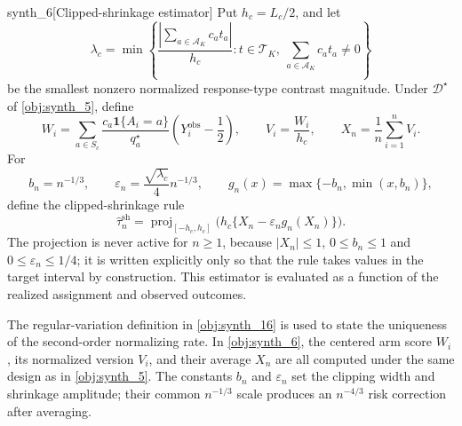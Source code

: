 \documentclass[11pt]{article}
\begin{document}
\begin{definitionv}{synth_6}[Clipped-shrinkage estimator]
Put \(h_c=L_c/2\), and let
\[
\lambda_c
=
\min\left\{
\frac{\left|\sum_{a\in\mathcal A_K} c_a t_a\right|}{h_c}
:
t\in\mathcal T_K,\
\sum_{a\in\mathcal A_K} c_a t_a\neq 0
\right\}
\]
be the smallest nonzero normalized response-type contrast magnitude. Under \(\mathcal D^\star\) of \cref{obj:synth_5}, define
\[
W_i=\sum_{a\in S_c}\frac{c_a\mathbf 1\{A_i=a\}}{q_a^\star}\left(Y_i^{\mathrm{obs}}-\frac12\right),
\qquad
V_i=\frac{W_i}{h_c},
\qquad
X_n=\frac1n\sum_{i=1}^nV_i.
\]
For
\[
b_n=n^{-1/3},\qquad
\varepsilon_n=\frac{\sqrt{\lambda_c}}4n^{-1/3},\qquad
g_n(x)=\max\{-b_n,\min(x,b_n)\},
\]
define the clipped-shrinkage rule
\[
\widehat\tau_n^{\mathrm{sh}}
=\operatorname{proj}_{[-h_c,h_c]}\bigl(h_c\{X_n-\varepsilon_ng_n(X_n)\}\bigr).
\]
The projection is never active for \(n\ge1\), because \(|X_n|\le1\), \(0\le b_n\le1\) and \(0\le\varepsilon_n\le1/4\); it is written explicitly only so that the rule takes values in the target interval by construction. This estimator is evaluated as a function of the realized assignment and observed outcomes.
\end{definitionv}

The regular-variation definition in \cref{obj:synth_16} is used to state the uniqueness of the second-order normalizing rate. In \cref{obj:synth_6}, the centered arm score \(W_i\), its normalized version \(V_i\), and their average \(X_n\) are all computed under the same design as in \cref{obj:synth_5}. The constants \(b_n\) and \(\varepsilon_n\) set the clipping width and shrinkage amplitude; their common \(n^{-1/3}\) scale produces an \(n^{-4/3}\) risk correction after averaging.
\end{document}
